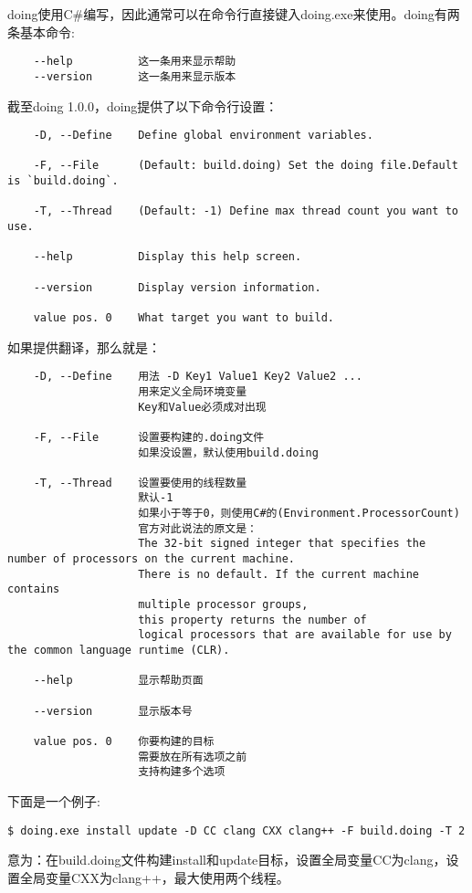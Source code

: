 doing使用C\#编写，因此通常可以在命令行直接键入doing.exe来使用。doing有两条基本命令:\newline{}
\begin{lstlisting}
	--help 			这一条用来显示帮助
	--version 		这一条用来显示版本
\end{lstlisting}
截至doing 1.0.0，doing提供了以下命令行设置：\newline{}
\begin{lstlisting}
	-D, --Define    Define global environment variables.
	
	-F, --File      (Default: build.doing) Set the doing file.Default is `build.doing`.
	
	-T, --Thread    (Default: -1) Define max thread count you want to use.
	
	--help          Display this help screen.
	
	--version       Display version information.
	
	value pos. 0    What target you want to build.
\end{lstlisting}
如果提供翻译，那么就是：\newline{}
\begin{lstlisting}
	-D, --Define    用法 -D Key1 Value1 Key2 Value2 ...
					用来定义全局环境变量
					Key和Value必须成对出现
	
	-F, --File      设置要构建的.doing文件
					如果没设置，默认使用build.doing
	
	-T, --Thread    设置要使用的线程数量
					默认-1
					如果小于等于0，则使用C#的(Environment.ProcessorCount)
					官方对此说法的原文是：
					The 32-bit signed integer that specifies the number of processors on the current machine. 
					There is no default. If the current machine contains 
					multiple processor groups,
					this property returns the number of 
					logical processors that are available for use by the common language runtime (CLR).
	
	--help          显示帮助页面
	
	--version       显示版本号
	
	value pos. 0  	你要构建的目标
					需要放在所有选项之前
					支持构建多个选项
\end{lstlisting}
下面是一个例子:
\begin{lstlisting}
$ doing.exe install update -D CC clang CXX clang++ -F build.doing -T 2
\end{lstlisting}
意为：在build.doing文件构建install和update目标，设置全局变量CC为clang，设置全局变量CXX为clang++，最大使用两个线程。


